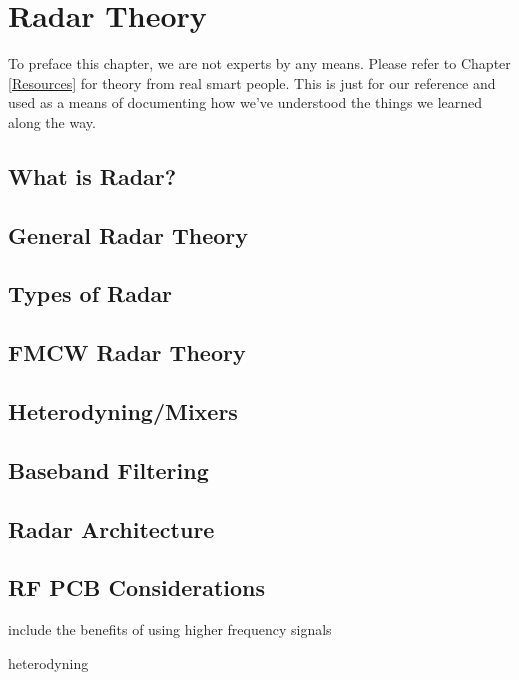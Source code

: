 \chapter{Radar Theory
\label{Radar Theory}}

To preface this chapter, we are not experts by any means. Please refer to Chapter \ref{Resources} for theory from real smart people.
This is just for our reference and used as a means of documenting how we've understood the things we learned along the way.

\section{What is Radar?}

\section{General Radar Theory}

\section{Types of Radar}

\section{FMCW Radar Theory}

\section{Heterodyning/Mixers}

\section{Baseband Filtering}

\section{Radar Architecture}

\section{RF PCB Considerations}

include the benefits of using higher frequency signals

heterodyning
